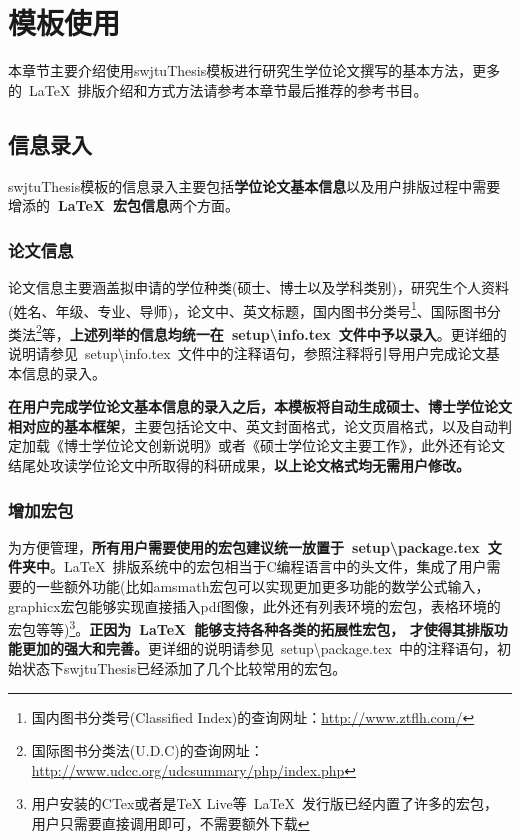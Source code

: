 \chapter{模板使用}

本章节主要介绍使用swjtuThesis模板进行研究生学位论文撰写的基本方法，更多的~\LaTeX{}~排版介绍和方式方法请参考本章节最后推荐的参考书目。

\section{信息录入}
swjtuThesis模板的信息录入主要包括\textbf{学位论文基本信息}以及用户排版过程中需要增添的\textbf{~\LaTeX{}~宏包信息}两个方面。

\subsection{论文信息}
论文信息主要涵盖拟申请的学位种类(硕士、博士以及学科类别)，研究生个人资料(姓名、年级、专业、导师)，论文中、英文标题，国内图书分类号\footnote{国内图书分类号(Classified Index)的查询网址：\url{http://www.ztflh.com/}}、国际图书分类法\footnote{国际图书分类法(U.D.C)的查询网址：\url{http://www.udcc.org/udcsummary/php/index.php}}等，\textbf{上述列举的信息均统一在~setup\textbackslash{}info.tex~文件中予以录入}。更详细的说明请参见~setup\textbackslash{}info.tex~文件中的注释语句，参照注释将引导用户完成论文基本信息的录入。

\par
\textbf{在用户完成学位论文基本信息的录入之后，本模板将自动生成硕士、博士学位论文相对应的基本框架}，主要包括论文中、英文封面格式，论文页眉格式，以及自动判定加载《博士学位论文创新说明》或者《硕士学位论文主要工作》，此外还有论文结尾处攻读学位论文中所取得的科研成果，\textbf{以上论文格式均无需用户修改。}

\subsection{增加宏包}
为方便管理，\textbf{所有用户需要使用的宏包建议统一放置于~setup\textbackslash{}package.tex~文件夹中}。\LaTeX{}~排版系统中的宏包相当于C编程语言中的头文件，集成了用户需要的一些额外功能(比如amsmath宏包可以实现更加更多功能的数学公式输入，graphicx宏包能够实现直接插入pdf图像，此外还有列表环境的宏包，表格环境的宏包等等)\footnote{用户安装的CTex或者是TeX Live等~\LaTeX{}~发行版已经内置了许多的宏包，用户只需要直接调用即可，不需要额外下载}。\textbf{正因为~\LaTeX{}~能够支持各种各类的拓展性宏包， 才使得其排版功能更加的强大和完善。}更详细的说明请参见~setup\textbackslash{}package.tex~中的注释语句，初始状态下swjtuThesis已经添加了几个比较常用的宏包。



